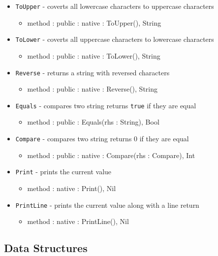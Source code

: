 \documentclass[12pt]{article}
\begin{document}
\begin{itemize}
\begin{itemize}
	\end{itemize}
    \item \texttt{ToUpper} - coverts all lowercase characters to uppercase characters
    	\begin{itemize}
	\item method : public : native : ToUpper(), String
	\end{itemize}
    \item \texttt{ToLower} - coverts all uppercase characters to lowercase characters
    	\begin{itemize}
	\item method : public : native : ToLower(), String
	\end{itemize}
     \item \texttt{Reverse} - returns a string with reversed characters
    	\begin{itemize}
	\item method : public : native : Reverse(), String
	\end{itemize}
    \item \texttt{Equals} - compares two string returns \texttt{true} if they are equal
    	\begin{itemize}
	\item method : public : Equals(rhs : String), Bool
	\end{itemize}
    \item \texttt{Compare} - compares two string returns 0 if they are equal
    	\begin{itemize}
	\item method : public : native : Compare(rhs : Compare), Int
	\end{itemize}
   \item \texttt{Print} - prints the current value
    	\begin{itemize}
	\item method : native : Print(), Nil
	\end{itemize}
    \item \texttt{PrintLine} - prints the current value along with a line return
    	\begin{itemize}
	\item method : native : PrintLine(), Nil
	\end{itemize}
\end{itemize}

\subsection{Data Structures}
\end{document}
